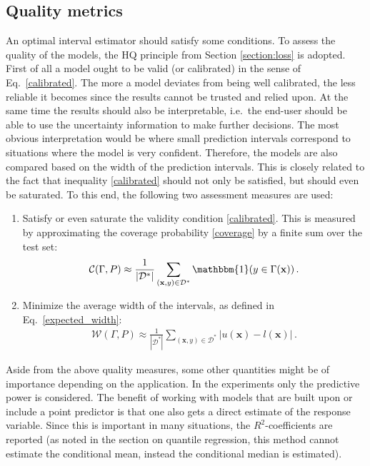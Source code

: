 \documentclass[smallcondensed]{svjour3}
\begin{document}
\subsection{Quality metrics}

    An optimal interval estimator should satisfy some conditions. To assess the quality of the models, the HQ principle from Section \ref{section:loss} is adopted. First of all a model ought to be valid (or calibrated) in the sense of Eq.~\eqref{calibrated}. The more a model deviates from being well calibrated, the less reliable it becomes since the results cannot be trusted and relied upon. At the same time the results should also be interpretable, i.e.\ the end-user should be able to use the uncertainty information to make further decisions. The most obvious interpretation would be where small prediction intervals correspond to situations where the model is very confident. Therefore, the models are also compared based on the width of the prediction intervals. This is closely related to the fact that inequality \eqref{calibrated} should not only be satisfied, but should even be saturated. To this end, the following two assessment measures are used:
    \begin{enumerate}
        \item Satisfy or even saturate the validity condition \eqref{calibrated}. This is measured by approximating the coverage probability \eqref{coverage} by a finite sum over the test set:
        \begin{gather}
            \mathcal{C}(\Gamma,P) \approx \frac{1}{|\mathcal{D}^*|}\sum_{(\mathbf{x},y)\in\mathcal{D}^*}\mathbbm{1}(y\in\Gamma(\mathbf{x}))\,.
        \end{gather}
        \item Minimize the average width of the intervals, as defined in Eq.~\eqref{expected_width}:
        \begin{gather}
            \mathcal{W}(\Gamma,P) \approx \frac{1}{|\mathcal{D}^*|}\sum_{(\mathbf{x},y)\in\mathcal{D}^*}|u(\mathbf{x}) - l(\mathbf{x})|\,.
        \end{gather}
    \end{enumerate}
    Aside from the above quality measures, some other quantities might be of importance depending on the application. In the experiments only the predictive power is considered. The benefit of working with models that are built upon or include a point predictor is that one also gets a direct estimate of the response variable. Since this is important in many situations, the $R^2$-coefficients are reported (as noted in the section on quantile regression, this method cannot estimate the conditional mean, instead the conditional median is estimated).
\end{document}
